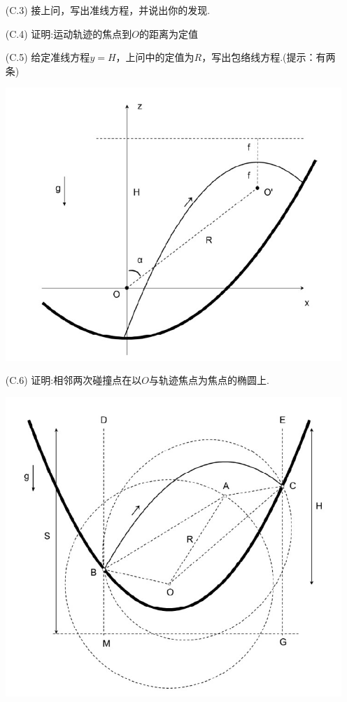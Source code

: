 \documentclass{article}
\begin{document}
\begin{itemize}
    \item[(C.3)]接上问，写出准线方程，并说出你的发现.
    \item[(C.4)]证明:运动轨迹的焦点到$O$的距离为定值
    \item[(C.5)]给定准线方程$y=H$，上问中的定值为$R$，写出包络线方程.(提示：有两条)
        \begin{center}
    \includegraphics[scale=0.3]{img/5.jpg}\par    
    \end{center}

    \item[(C.6)]证明:相邻两次碰撞点在以$O$与轨迹焦点为焦点的椭圆上. 
        
        \begin{center}
    \includegraphics[scale=0.3]{img/6.jpg}\par    
    \end{center}

\end{itemize}
\end{document}
